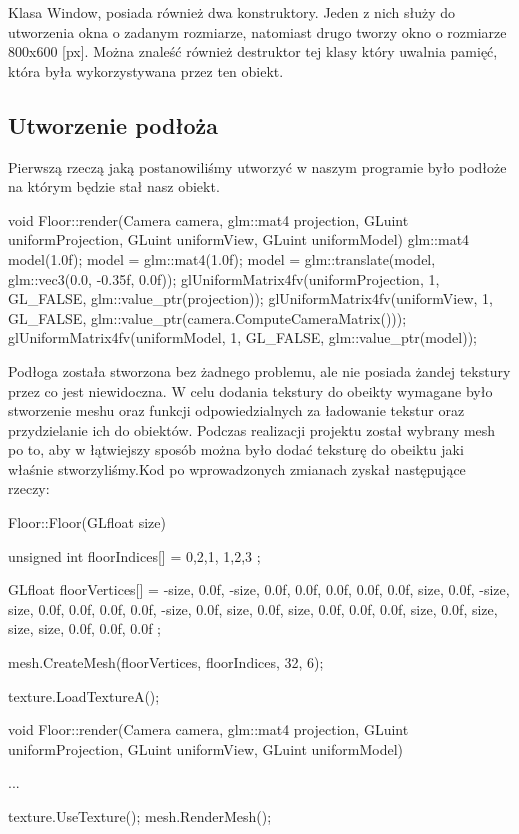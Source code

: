 \documentclass[a4paper,12pt]{article}
\numberwithin{equation}{section}
\begin{document}
Klasa Window, posiada również dwa konstruktory. Jeden z nich służy do utworzenia okna o zadanym rozmiarze, natomiast drugo tworzy okno o rozmiarze 800x600 [px]. Można znaleść również destruktor tej klasy który uwalnia pamięć, która była wykorzystywana przez ten obiekt. 


\subsection{Utworzenie podłoża}
Pierwszą rzeczą jaką postanowiliśmy utworzyć w naszym programie było podłoże na którym będzie stał nasz obiekt. 
\begin{cppcode}

void Floor::render(Camera camera, glm::mat4 projection, GLuint uniformProjection, GLuint uniformView, GLuint uniformModel)
{
	glm::mat4 model(1.0f);
	model = glm::mat4(1.0f);
	model = glm::translate(model, glm::vec3(0.0, -0.35f, 0.0f));
	glUniformMatrix4fv(uniformProjection, 1, GL_FALSE, glm::value_ptr(projection));
	glUniformMatrix4fv(uniformView, 1, GL_FALSE, glm::value_ptr(camera.ComputeCameraMatrix()));
	glUniformMatrix4fv(uniformModel, 1, GL_FALSE, glm::value_ptr(model));
}
\end{cppcode}

Podłoga została stworzona bez żadnego problemu, ale nie posiada żandej tekstury przez co jest niewidoczna. W celu dodania tekstury do obeikty wymagane było stworzenie meshu oraz funkcji odpowiedzialnych za ładowanie tekstur oraz przydzielanie ich do obiektów. Podczas realizacji projektu został wybrany mesh po to, aby w łątwiejszy sposób można było dodać teksturę do obeiktu jaki właśnie stworzyliśmy.Kod po wprowadzonych zmianach zyskał następujące rzeczy:
\begin{cppcode}
Floor::Floor(GLfloat size)
{
	unsigned int floorIndices[] = {
		0,2,1,
		1,2,3
	};

	GLfloat floorVertices[] = {
		-size,  0.0f, -size,   0.0f,  0.0f,   0.0f,  0.0f,  0.0f,
		 size,  0.0f, -size,  size,  0.0f,	0.0f,  0.0f,  0.0f,
		-size,  0.0f,  size,   0.0f,  size,	0.0f,  0.0f,  0.0f,
		 size,  0.0f,  size,  size,  size,  0.0f,  0.0f,  0.0f
	};

	mesh.CreateMesh(floorVertices, floorIndices, 32, 6);

	texture.LoadTextureA();
}

void Floor::render(Camera camera, glm::mat4 projection, GLuint uniformProjection, GLuint uniformView, GLuint uniformModel)
{
    ...
    
	texture.UseTexture();
	mesh.RenderMesh();
}
\end{cppcode}
\end{document}

